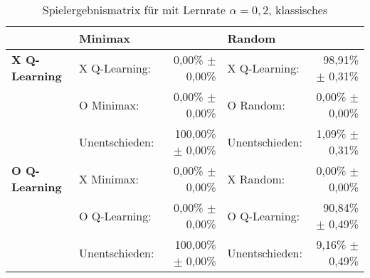 \begin{table}[ht]
\centering
\caption[Spielergebnismatrix \qlearning: $\alpha=0,2$, klassisches \splay]{Spielergebnismatrix für \qlearning mit Lernrate $\alpha=0,2$, klassisches \splay}
\label{tab:resultmatrix_ql_normal_alpha02}

\begin{tabular}{llrlr}
\toprule
 & \multicolumn{2}{l}{\textbf{Minimax}} & \multicolumn{2}{l}{\textbf{Random}} \\ \midrule
\textbf{X Q-Learning}   & X Q-Learning:     & 0,00\% $\pm$    0,00\%            & X Q-Learning:         & 98,91\% $\pm$ 0,31\%  \\
                        & O Minimax:        & 0,00\% $\pm$    0,00\%            & O Random:             & 0,00\% $\pm$  0,00\%  \\
                        & Unentschieden:    & 100,00\% $\pm$  0,00\%            & Unentschieden:        & 1,09\% $\pm$  0,31\%  \\ \cmidrule{2-5}
\textbf{O Q-Learning}   & X Minimax:        & 0,00\% $\pm$    0,00\%            & X Random:             & 0,00\% $\pm$  0,00\%  \\
                        & O Q-Learning:     & 0,00\% $\pm$    0,00\%            & O Q-Learning:         & 90,84\% $\pm$ 0,49\%  \\
                        & Unentschieden:    & 100,00\% $\pm$  0,00\%            & Unentschieden:        & 9,16\% $\pm$  0,49\%  \\ \bottomrule
\end{tabular}
\end{table}